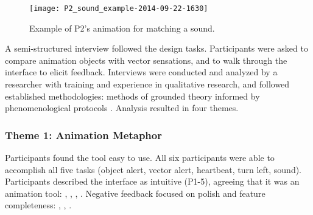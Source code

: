 %
%
\begin{figure}[htb] %
   \centering
	   	\texttt{[image: P2\_sound\_example-2014-09-22-1630]} 

	\caption{Example of P2's animation for matching a sound.} %
	\label{fig:animation:example:p2}
\end{figure}




A semi-structured interview followed the design tasks.
Participants were asked to compare animation objects with vector sensations, and to walk through the interface to elicit feedback.
%
%
Interviews were conducted and analyzed by a researcher with training and experience in qualitative research, and followed established methodologies:
methods of grounded theory  \cite{Corbin2008} informed by phenomenological protocols \cite{Moustakas1994}.
Analysis resulted in four themes.

\subsubsection{Theme 1: Animation Metaphor}
Participants found the tool easy to use.
All six participants were able to accomplish all five tasks (object alert, vector alert, heartbeat, turn left, sound).
Participants described the interface as intuitive (P1-5), agreeing that it was an animation tool: , , , .
Negative feedback focused on polish and feature completeness:
, , .


